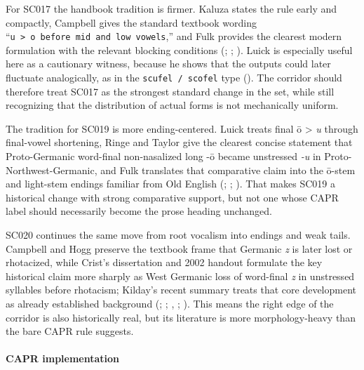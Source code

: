 \documentclass[
  british,
  a4paper,
]{article}
\begin{document}
For SC017 the handbook tradition is firmer. Kaluza states the rule early
and compactly, Campbell gives the standard textbook wording
``\texttt{u\ \textgreater{}\ o\ before\ mid\ and\ low\ vowels},'' and
Fulk provides the clearest modern formulation with the relevant blocking
conditions (;
;
). Luick is especially
useful here as a cautionary witness, because he shows that the outputs
could later fluctuate analogically, as in the \texttt{scufel\ /\ scofel}
type (). The corridor should
therefore treat SC017 as the strongest standard change in the set, while
still recognizing that the distribution of actual forms is not
mechanically uniform.

The tradition for SC019 is more ending-centered. Luick treats final ō
\textgreater{} \emph{u} through final-vowel shortening, Ringe and Taylor
give the clearest concise statement that Proto-Germanic word-final
non-nasalized long -ō became unstressed \emph{-u} in
Proto-Northwest-Germanic, and Fulk translates that comparative claim
into the ō-stem and light-stem endings familiar from Old English
(;
;
). That makes SC019 a historical
change with strong comparative support, but not one whose CAPR label
should necessarily become the prose heading unchanged.

SC020 continues the same move from root vocalism into endings and weak
tails. Campbell and Hogg preserve the textbook frame that Germanic
\emph{z} is later lost or rhotacized, while Crist's dissertation and
2002 handout formulate the key historical claim more sharply as West
Germanic loss of word-final \emph{z} in unstressed syllables before
rhotacism; Kilday's recent summary treats that core development as
already established background (; ;
, ;
). This means the right edge of
the corridor is also historically real, but its literature is more
morphology-heavy than the bare CAPR rule suggests.

\paragraph{CAPR implementation}\label{capr-implementation-12}
\end{document}
